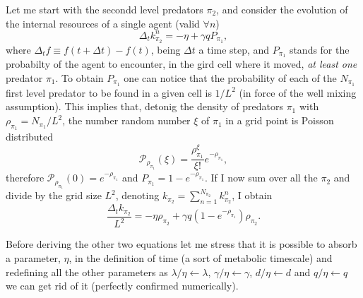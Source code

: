 \documentclass[10pt]{article}
\begin{document}
Let me start with the secondd level predators $\pi_2$, and consider the evolution of the internal resources
of a single agent (valid $\forall n$)
\begin{equation}
\label{eq:single_pi2}
\Delta_tk^n_{\pi_2} = -\eta + \gamma q P_{\pi_1},
\end{equation}
where $\Delta_tf \equiv f(t+\Delta t)-f(t)$, being $\Delta t$ a time step, and $P_{\pi_1}$
stands for the probabilty of the agent to encounter, in the gird cell where it moved,
{\it at least one} predator $\pi_1$. To obtain $P_{\pi_1}$ one can notice that
the probability of each of the $N_{\pi_1}$ first level predator to be found in
a given cell is $1/L^2$ (in force of the well mixing assumption). This implies that, detonig the density of
predators $\pi_1$ with $\rho_{\pi_1}=N_{\pi_1}/L^2$, the number random number $\xi$ of $\pi_1$
in a grid point is Poisson distributed
\begin{equation}
\mathcal P_{\rho_{\pi_1}}(\xi)=\frac{\rho_{\pi_1}^{\xi}}{\xi!}e^{-\rho_{\pi_1}},
\end{equation}
therefore $\mathcal P_{\rho_{\pi_1}}(0)=e^{-\rho_{\pi_1}}$ and $P_{\pi_1}= 1-e^{-\rho_{\pi_1}}$.
If I now sum over all the $\pi_2$ and divide by the grid size $L^2$, denoting $k_{\pi_2}=\sum_{n=1}^{N_{\pi_2}}k^n_{\pi_2}$, I obtain
\begin{equation}
\frac{\Delta_tk_{\pi_2}}{L^2} = -\eta\rho_{\pi_2}+ \gamma q (1-e^{-\rho_{\pi_1}})\rho_{\pi_2}.
\end{equation}

Before deriving the other two equations let me stress that it is possible to absorb
a parameter, $\eta$, in the definition of time (a sort of metabolic timescale)
and redefining all the other parameters as $\lambda/\eta\leftarrow\lambda$, $\gamma/\eta\leftarrow\gamma$,
$d/\eta\leftarrow d$ and $q/\eta\leftarrow q$ we can get rid of it (perfectly confirmed numerically).
\end{document}
